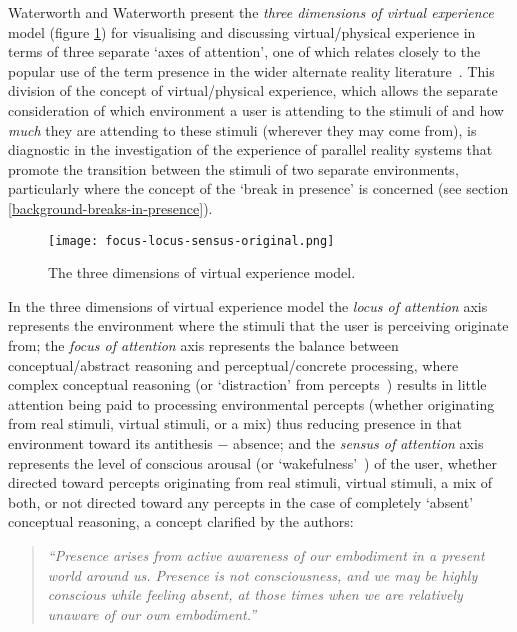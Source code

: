 Waterworth and Waterworth present the \textit{three dimensions of virtual experience} model (figure \ref{focus-locus-sensus-original}) for visualising and discussing virtual/physical experience in terms of three separate `axes of attention', one of which relates closely to the popular use of the term presence in the wider alternate reality literature~\cite{Waterworth2001}. This division of the concept of virtual/physical experience, which allows the separate consideration of which environment a user is attending to the stimuli of and how \textit{much} they are attending to these stimuli (wherever they may come from), is diagnostic in the investigation of the experience of parallel reality systems that promote the transition between the stimuli of two separate environments, particularly where the concept of the `break in presence' is concerned (see section \ref{background-breaks-in-presence}).

\begin{figure}[h]
	\begin{center}
		\texttt{[image: focus-locus-sensus-original.png]}
		\caption{The three dimensions of virtual experience model.}
		\label{focus-locus-sensus-original}
	\end{center}	
\end{figure}

In the three dimensions of virtual experience model the \textit{locus of attention} axis represents the environment where the stimuli that the user is perceiving originate from; the \textit{focus of attention} axis represents the balance between conceptual/abstract reasoning and perceptual/concrete processing, where complex conceptual reasoning (or `distraction' from percepts~\cite{Chalmers2014}) results in little attention being paid to processing environmental percepts (whether originating from real stimuli, virtual stimuli, or a mix) thus reducing presence\presencefootnote{} in that environment toward its antithesis $-$ absence\absencefootnote{}; and the \textit{sensus of attention} axis represents the level of conscious arousal (or `wakefulness'~\cite{Laureys2009}) of the user, whether directed toward percepts originating from real stimuli, virtual stimuli, a mix of both, or not directed toward any percepts in the case of completely `absent' conceptual reasoning, a concept clarified by the authors:

\begin{quote}
	\textit{``Presence arises from active awareness of our embodiment in a present world around us. Presence is not consciousness, and we may be highly conscious while feeling absent, at those times when we are relatively unaware of our own embodiment.''}~\cite{Waterworth2014}
\end{quote}

